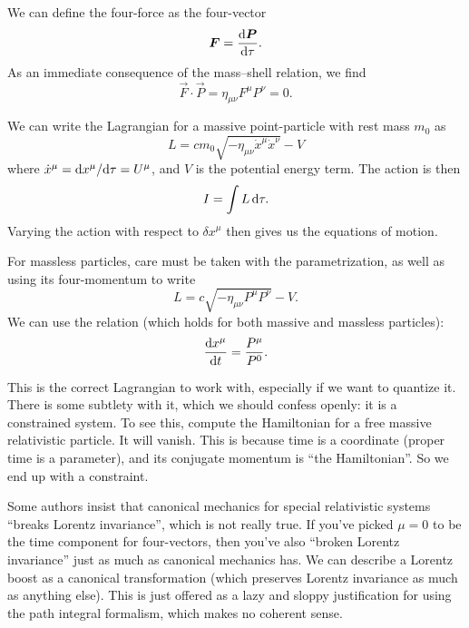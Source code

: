 We can define the four-force as the four-vector
\begin{equation}
\boldsymbol{F} = \frac{\mathrm{d}\boldsymbol{P}}{\mathrm{d}\tau}.
\end{equation}
As an immediate consequence of the mass--shell relation, we find
\begin{equation}
\vec{F}\cdot\vec{P} = \eta_{\mu\nu}F^{\mu}P^{\nu} = 0.
\end{equation}

We can write the Lagrangian for a massive point-particle with rest mass
$m_{0}$ as
\begin{equation}
L = cm_{0}\sqrt{-\eta_{\mu\nu}\dot{x}^{\mu}\dot{x}^{\nu}} - V
\end{equation}
where $\dot{x}^{\mu} = \mathrm{d} x^{\mu}/\mathrm{d}\tau = U^{\mu}$, and $V$ is the potential
energy term. The action is then 
\begin{equation}
I = \int L\,\mathrm{d}\tau.
\end{equation}
Varying the action with respect to $\delta x^{\mu}$ then gives us the
equations of motion.

For massless particles, care must be taken with the parametrization, as
well as using its four-momentum to write
\begin{equation}
L = c\sqrt{-\eta_{\mu\nu}P^{\mu}P^{\nu}} - V.
\end{equation}
We can use the relation (which holds for both massive and massless particles):
\begin{equation}
\frac{\mathrm{d} x^{\mu}}{\mathrm{d} t} = \frac{P^{\mu}}{P^{0}}.
\end{equation}

\begin{danger}
This is the correct Lagrangian to work with, especially if we want to
quantize it. There is some subtlety with it, which we should confess
openly: it is a constrained system. To see this, compute the Hamiltonian
for a free massive relativistic particle. It will vanish. This is
because time is a coordinate (proper time is a parameter), and its
conjugate momentum is ``the Hamiltonian''. So we end up with a
constraint. 
\end{danger}

\begin{ddanger}
Some authors insist that canonical mechanics for special relativistic
systems ``breaks Lorentz invariance'', which is not really true. If
you've picked $\mu=0$ to be the time component for four-vectors, then
you've also ``broken Lorentz invariance'' just as much as canonical
mechanics has. We can describe a Lorentz boost as a canonical
transformation (which preserves Lorentz invariance as much as anything
else). This is just offered as a lazy and sloppy justification for using
the path integral formalism, which makes no coherent sense.
\end{ddanger}

